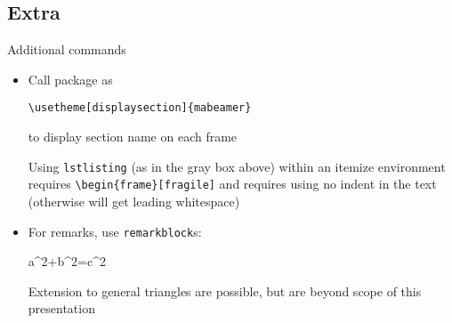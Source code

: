 \documentclass{beamer}
\begin{document}
\subsection{Extra}
\begin{frame}[fragile]{Additional commands}
	\begin{itemize}
		\item Call package  as
		\begin{lstlisting}
\usetheme[displaysection]{mabeamer}
		\end{lstlisting}
		to display section name on each frame
		\begin{alertblock}[\bigexclaim]
			Using \texttt{lstlisting} (as in the gray box above) within an itemize environment requires 
			 \texttt{\textbackslash begin\{frame\}[fragile]} and requires using no indent in the text (otherwise will get leading whitespace)
		\end{alertblock}
		
		\item For remarks, 	use \texttt{remarkblock}s:
		\begin{equationblock}[Pythagoras]
			a^2+b^2=c^2
		\end{equationblock}
		\begin{remarkblock}
			\centering Extension to general triangles are possible, but are beyond scope of this presentation
		\end{remarkblock}
	\end{itemize}

\end{frame}
\end{document}
